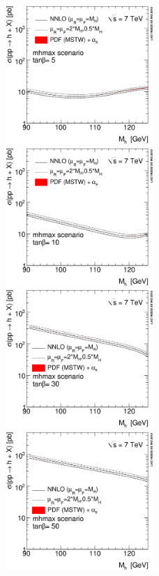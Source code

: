\begin{figure}[htb]
\includegraphics[width=0.5\textwidth]{YRHXS_MSSM_neutral/YRHXS_MSSM_neutral_fig2a.eps}
\includegraphics[width=0.5\textwidth]{YRHXS_MSSM_neutral/YRHXS_MSSM_neutral_fig2b.eps}
\includegraphics[width=0.5\textwidth]{YRHXS_MSSM_neutral/YRHXS_MSSM_neutral_fig2c.eps}
\includegraphics[width=0.5\textwidth]{YRHXS_MSSM_neutral/YRHXS_MSSM_neutral_fig2d.eps}

\end{figure}
